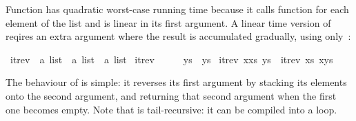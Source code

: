 \begin{isabellebody}
\begin{isamarkuptext}
Function  has quadratic worst-case running time
because it calls function  for each element of the list and
 is linear in its first argument.  A linear time version of
 reqires an extra argument where the result is accumulated
gradually, using only~:%
\end{isamarkuptext}%
\isamarkuptrue%
\isamarkupfalse%
\ itrev\ {}{}\ {}{}a\ list\ {}\ {}a\ list\ {}\ {}a\ list{}\ \isanewline
{}itrev\ {}{}\ \ \ \ \ ys\ {}\ ys{}\ {}\isanewline
{}itrev\ {}x{}xs{}\ ys\ {}\ itrev\ xs\ {}x{}ys{}{}%
\begin{isamarkuptext}%
\noindent
The behaviour of  is simple: it reverses
its first argument by stacking its elements onto the second argument,
and returning that second argument when the first one becomes
empty. Note that  is tail-recursive: it can be
compiled into a loop.


\end{isamarkuptext}
\end{isabellebody}
